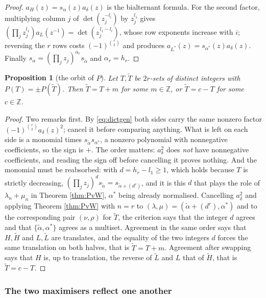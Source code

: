 \documentclass[11pt,reqno]{amsart}
\theoremstyle{plain}
\newtheorem{proposition}[theorem]{Proposition}
\theoremstyle{definition}
\newcommand{\ZZ}{\mathbb{Z}}
\begin{document}
\begin{proof}
$a_H(z)=s_\alpha(z)a_\delta(z)$ is the bialternant formula. For the second factor, multiplying column
$j$ of $\det(z_j^{-l_i})$ by $z_j^{l_1}$ gives $(\prod_j z_j^{l_1})a_L(z^{-1})=\det(z_j^{\,l_1-l_i})$,
whose row exponents increase with $i$; reversing the $r$ rows costs $(-1)^{\binom r2}$ and produces
$a_{L^{*}}(z)=s_{\alpha^{*}}(z)a_\delta(z)$. Finally $s_\alpha=(\prod_j z_j)^{\alpha_r}s_{\tilde\alpha}$
and $\alpha_r=h_r$.
\end{proof}

\begin{proposition}[the orbit of $P$]\label{prop:orbitgen}
Let $T,\widetilde T$ be $2r$-sets of distinct integers with $P(T)=\pm P(\widetilde T)$. Then
$\widetilde T=T+m$ for some $m\in\ZZ$, or $\widetilde T=c-T$ for some $c\in\ZZ$.
\end{proposition}

\begin{proof}
Two remarks first. By \eqref{eq:dictgen} both sides carry the same nonzero factor
$(-1)^{\binom r2}a_\delta(z)^{2}$; cancel it before comparing anything. What is left on each side is
a monomial times $s_{\tilde\alpha}s_{\alpha^{*}}$, a nonzero polynomial with nonnegative
coefficients, so the sign is $+$. The order matters: $a_\delta^{2}$ does \emph{not} have
nonnegative coefficients, and reading the sign off before cancelling it proves nothing. And the
monomial must be reabsorbed: with $d=h_r-l_1\ge1$, which holds because
$T$ is strictly decreasing, $(\prod_j z_j)^{d}s_{\tilde\alpha}=s_{\tilde\alpha+(d^{r})}$, and it is
this $d$ that plays the role of $\lambda_n+\mu_n$ in Theorem \ref{thm:PvW}, $\alpha^{*}$ being already
normalised. Cancelling $a_\delta^2$ and applying Theorem \ref{thm:PvW} with $n=r$ to
$(\lambda,\mu)=(\tilde\alpha+(d^{r}),\alpha^{*})$ and to the corresponding pair $(\nu,\rho)$ for
$\widetilde T$, the criterion says that the integer $d$ agrees and that
$\{\tilde\alpha,\alpha^{*}\}$ agrees as a multiset. Agreement in the same order says that $H,\widetilde
H$ and $L,\widetilde L$ are translates, and the equality of the two integers $d$ forces the same
translation on both halves, that is $\widetilde T=T+m$. Agreement after swapping says that $H$ is, up
to translation, the reverse of $\widetilde L$ and $L$ that of $\widetilde H$, that is $\widetilde
T=c-T$.
\end{proof}

\subsubsection*{The two maximisers reflect one another}
\end{document}
